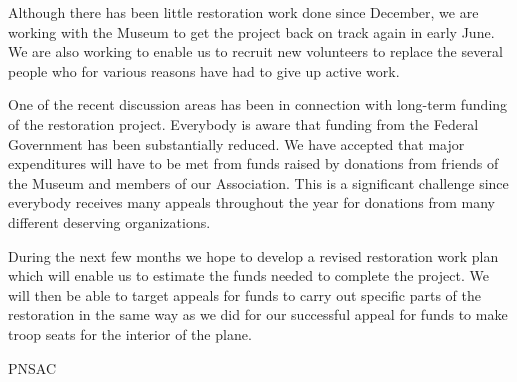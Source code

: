 Although there has been little restoration work done since December,
we are working with the Museum to get the project back on track again
in early June. We are also working to enable us to recruit new
volunteers to replace the several people who for various reasons have
had to give up active work.

One of the recent discussion areas has been in connection with
long-term funding of the restoration project. Everybody is aware that
funding from the Federal Government has been substantially reduced. We
have accepted that major  expenditures will have to be met from funds
raised by donations from friends of the Museum and members of our
Association. This is a significant challenge since everybody receives
many appeals throughout the year for donations from many different
deserving organizations. 

During the next few months we hope to develop a revised restoration
work plan which will enable us to estimate the funds needed to
complete the project. We will then be able to target appeals for funds
to carry out specific parts of the restoration in the same way as we
did for our successful appeal for funds to make troop seats for the
interior of the plane.

\begin{footnotesize}
    \raggedleft PNSAC\\
\end{footnotesize}




